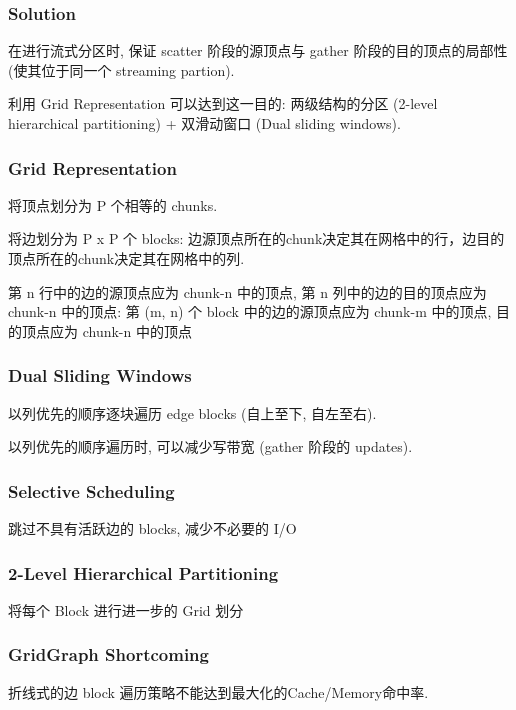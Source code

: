 \documentclass[UTF8,12pt,a4paper]{article}
\begin{document}
\subsubsection{Solution}
\begin{compactitem}
  \item 在进行流式分区时, 保证 scatter 阶段的源顶点与 gather 阶段的目的顶点的局部性 (使其位于同一个 streaming partion).
  \item 利用 Grid Representation 可以达到这一目的:
  两级结构的分区 (2-level hierarchical partitioning) + 双滑动窗口 (Dual sliding windows).
\end{compactitem}
\subsubsection{Grid Representation}
\begin{compactitem}
  \item 将顶点划分为 P 个相等的 chunks.
  \item 将边划分为 P x P 个 blocks: 边源顶点所在的chunk决定其在网格中的行，边目的顶点所在的chunk决定其在网格中的列.
\end{compactitem}
第 n 行中的边的源顶点应为 chunk-n 中的顶点,
第 n 列中的边的目的顶点应为 chunk-n 中的顶点: 第 (m, n) 个 block 中的边的源顶点应为 chunk-m 中的顶点,
目的顶点应为 chunk-n 中的顶点
\subsubsection{Dual Sliding Windows}
\begin{compactitem}
  \item 以列优先的顺序逐块遍历 edge blocks (自上至下, 自左至右).
  \item 以列优先的顺序遍历时, 可以减少写带宽 (gather 阶段的 updates).
\end{compactitem}
\subsubsection{Selective Scheduling}
跳过不具有活跃边的 blocks, 减少不必要的 I/O
\subsubsection{2-Level Hierarchical Partitioning}
将每个 Block 进行进一步的 Grid 划分
\subsubsection{GridGraph Shortcoming}
\begin{compactitem}
  \item 折线式的边 block 遍历策略不能达到最大化的Cache/Memory命中率.
\end{compactitem}
\end{document}
